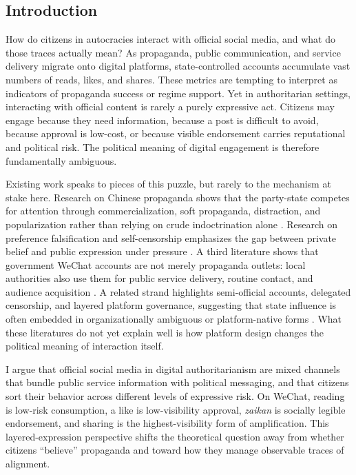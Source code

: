 \documentclass[12pt, american]{article}
\begin{document}
\begin{refsection}

\section{Introduction}

How do citizens in autocracies interact with official social media, and what do those traces actually mean? As propaganda, public communication, and service delivery migrate onto digital platforms, state-controlled accounts accumulate vast numbers of reads, likes, and shares. These metrics are tempting to interpret as indicators of propaganda success or regime support. Yet in authoritarian settings, interacting with official content is rarely a purely expressive act. Citizens may engage because they need information, because a post is difficult to avoid, because approval is low-cost, or because visible endorsement carries reputational and political risk. The political meaning of digital engagement is therefore fundamentally ambiguous.

Existing work speaks to pieces of this puzzle, but rarely to the mechanism at stake here. Research on Chinese propaganda shows that the party-state competes for attention through commercialization, soft propaganda, distraction, and popularization rather than relying on crude indoctrination alone \parencite{Brady2008,KingPanRoberts2017,LuPan2021,MattinglyYao2022,RepnikovaFang2018,Roberts2018,Stockmann2013,Wang2024Propaganda,Zou2021}. Research on preference falsification and self-censorship emphasizes the gap between private belief and public expression under pressure \parencite{CarterCarterSchick2024,JiangYang2016,Kuran1995,NoelleNeumann1993,ShenTruex2020}. A third literature shows that government WeChat accounts are not merely propaganda outlets: local authorities also use them for public service delivery, routine contact, and audience acquisition \parencite{JiangEtAl2021,LiuMaXia2024,YuShen2026,Zheng2013,ZhengZheng2014}. A related strand highlights semi-official accounts, delegated censorship, and layered platform governance, suggesting that state influence is often embedded in organizationally ambiguous or platform-native forms \parencite{Neagli2021,SunZhao2022,TaiFu2020}. What these literatures do not yet explain well is how platform design changes the political meaning of interaction itself.

I argue that official social media in digital authoritarianism are mixed channels that bundle public service information with political messaging, and that citizens sort their behavior across different levels of expressive risk. On WeChat, reading is low-risk consumption, a like is low-visibility approval, \textit{zaikan} is socially legible endorsement, and sharing is the highest-visibility form of amplification. This layered-expression perspective shifts the theoretical question away from whether citizens ``believe'' propaganda and toward how they manage observable traces of alignment.


\end{refsection}
\end{document}
